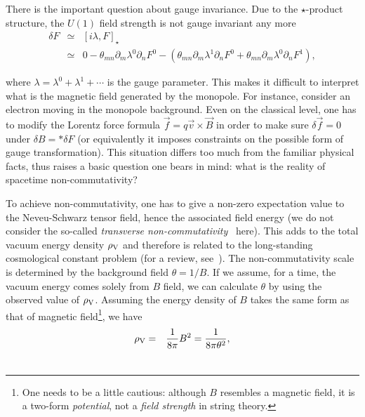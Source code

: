 \documentclass[a4paper,12pt]{article}
\begin{document}
There is the important question about gauge invariance. Due to 
the $\star$-product structure, the $U(1)$ f\mbox{}ield strength is not 
gauge invariant any more
{\setlength\arraycolsep{2pt}
\begin{eqnarray}
\delta F & \simeq & [i\lambda, F]_{\star} \nonumber\\
 & \simeq & 0-\theta_{mn}\partial_m \lambda^0\partial_n F^0
            -(\theta_{mn}\partial_m \lambda^1\partial_n F^0
              +\theta_{mn}\partial_m \lambda^0\partial_n F^1),
\end{eqnarray}}

\vskip -0.5cm
\noindent where $\lambda=\lambda^0+\lambda^1+\cdots$ is the gauge parameter.
This makes it dif\mbox{}f\mbox{}icult to interpret what is the magnetic 
f\mbox{}ield generated by the monopole. For instance, consider an electron
moving in the monopole background. Even on the classical level, one has
to modify the Lorentz force formula $\vec f =q\vec v\times \vec B$ in order
to make sure $\delta \vec f =0$ under $\delta B=\ast \delta F$ (or 
equivalently it imposes constraints on the possible form of gauge 
transformation). This situation dif\mbox{}fers too much from the 
familiar physical
facts, thus raises a basic question one bears in mind: what is the reality
of spacetime non-commutativity?

To achieve non-commutativity, one has to give a non-zero expectation value
to the Neveu-Schwarz tensor f\mbox{}ield, hence the associated
f\mbox{}ield energy (we do not consider the so-called \emph{transverse
non-commutativity}~\cite{ew} here). This adds to the total vacuum energy 
density $\rho_{\rm V}$ and 
therefore is related to the long-standing cosmological constant 
problem (for a review, see~\cite{w}). The non-commutativity scale is
determined by the background f\mbox{}ield $\theta =1/B$. If we assume, 
for a time, the vacuum energy comes solely from $B$ f\mbox{}ield, we can
calculate $\theta$ by using the observed value of $\rho_{\rm V}$.
Assuming the energy density of $B$ takes the same form as that of
magnetic f\mbox{}ield\footnote{One needs to be a little cautious: although $B$
resembles a magnetic f\mbox{}ield, it is a two-form \emph{potential}, not a
\emph{f\mbox{}ield strength} in string theory.}, we have
{\setlength\arraycolsep{2pt}
\begin{eqnarray} 
\rho_{\rm V} & = & \frac{1}{8\pi}B^2=\frac{1}{8\pi \theta^2},\\
             &   & \nonumber
\end{eqnarray}}
\end{document}
